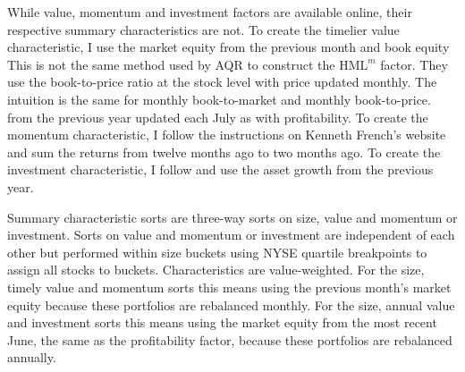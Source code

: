 While value, momentum and investment factors are available online, their
respective summary characteristics are not. To create the timelier value
characteristic, I use the market equity from the previous month and book equity
This is not the same method used by AQR to construct the $\text{HML}^m$ factor.
They use the book-to-price ratio at the stock level with price updated monthly.
The intuition is the same for monthly book-to-market and monthly book-to-price.
from the previous year updated each July as with profitability.
To create the
momentum characteristic, I follow the instructions on Kenneth French’s website
and sum the returns from twelve months ago to two months ago. To create the
investment characteristic, I follow \textcite{fama2015five} and use the asset
growth from the previous year.

Summary characteristic sorts are three-way sorts on size, value and momentum or
investment. Sorts on value and momentum or investment are independent of each
other but performed within size buckets using NYSE quartile breakpoints to
assign all stocks to buckets. Characteristics are value-weighted. For the size,
timely value and momentum sorts this means using the previous month’s market
equity because these portfolios are rebalanced monthly. For the size, annual
value and investment sorts this means using the market equity from the most
recent June, the same as the profitability factor, because these portfolios are
rebalanced annually.
